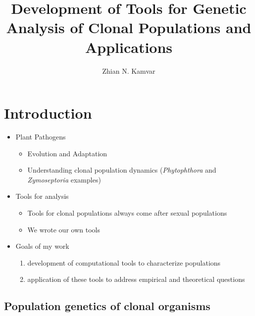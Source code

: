 \documentclass[double,12pt]{beavtex}
\title{Development of Tools for Genetic Analysis of Clonal Populations and
Applications} %
\author{Zhian N. Kamvar} %
\providecommand{\tightlist}{%
  \setlength{\itemsep}{0pt}\setlength{\parskip}{0pt}}
\begin{document}
\maketitle
\mainmatter


  \chapter{Introduction}\label{introduction}
  
  \begin{itemize}
  \tightlist
  \item
    Plant Pathogens
  
    \begin{itemize}
    \tightlist
    \item
      Evolution and Adaptation
    \item
      Understanding clonal population dynamics (\emph{Phytophthora} and
      \emph{Zymoseptoria} examples)
    \end{itemize}
  \item
    Tools for analysis
  
    \begin{itemize}
    \tightlist
    \item
      Tools for clonal populations always come after sexual populations
    \item
      We wrote our own tools
    \end{itemize}
  \item
    Goals of my work
  
    \begin{enumerate}
    \def\labelenumi{\arabic{enumi}.}
    \tightlist
    \item
      development of computational tools to characterize populations
    \item
      application of these tools to address empirical and theoretical
      questions
    \end{enumerate}
  \end{itemize}
  
  \section{Population genetics of clonal
  organisms}\label{population-genetics-of-clonal-organisms}
  
\end{document}
